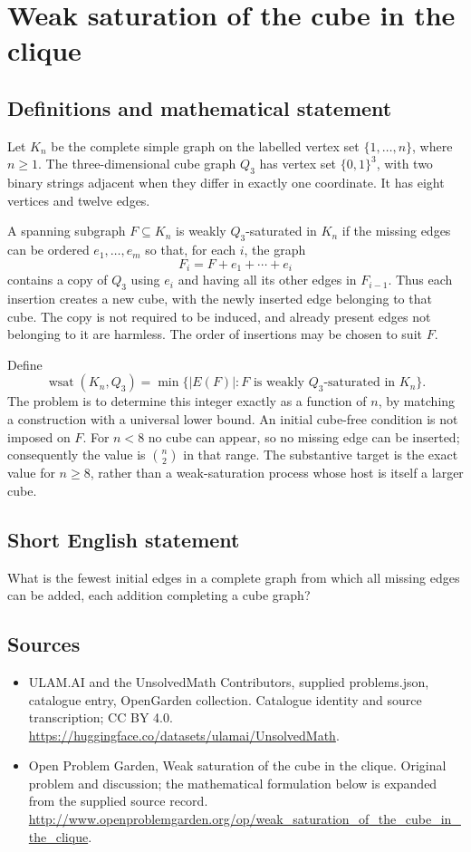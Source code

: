 \documentclass[11pt,a4paper]{article}
\begin{document}
\section*{Weak saturation of the cube in the clique}\label{statement}

\subsection{Definitions and mathematical statement}
Let $K_n$ be the complete simple graph on the labelled vertex set
$\{1,\ldots,n\}$, where $n\ge1$. The three-dimensional cube graph $Q_3$
has vertex set $\{0,1\}^3$, with two binary strings adjacent when they
differ in exactly one coordinate. It has eight vertices and twelve
edges.

A spanning subgraph $F\subseteq K_n$ is weakly $Q_3$-saturated in $K_n$
if the missing edges can be ordered $e_1,\ldots,e_m$ so that, for each
$i$, the graph
\[
                   F_i=F+e_1+\cdots+e_i
\]
contains a copy of $Q_3$ using $e_i$ and having all its other edges in
$F_{i-1}$. Thus each insertion creates a new cube, with the newly
inserted edge belonging to that cube. The copy is not required to be
induced, and already present edges not belonging to it are harmless.
The order of insertions may be chosen to suit $F$.

Define
\[
 \operatorname{wsat}(K_n,Q_3)=
       \min\{|E(F)|:F\text{ is weakly }Q_3\text{-saturated in }K_n\}.
\]
The problem is to determine this integer exactly as a function of $n$,
by matching a construction with a universal lower bound. An initial
cube-free condition is not imposed on $F$. For $n<8$ no cube can appear,
so no missing edge can be inserted; consequently the value is
$\binom n2$ in that range. The substantive target is the exact value
for $n\ge8$, rather than a weak-saturation process whose host is itself
a larger cube.
\subsection{Short English statement}
What is the fewest initial edges in a complete graph from which all missing edges can be added, each addition completing a cube graph?
\subsection{Sources}
\begin{itemize}
\item[S1] ULAM.AI and the UnsolvedMath Contributors, supplied problems.json, catalogue entry, OpenGarden collection. Catalogue identity and source transcription; CC BY 4.0.
\url{https://huggingface.co/datasets/ulamai/UnsolvedMath}.
\item[S2] Open Problem Garden, Weak saturation of the cube in the clique. Original problem and discussion; the mathematical formulation below is expanded from the supplied source record.
\url{http://www.openproblemgarden.org/op/weak_saturation_of_the_cube_in_the_clique}.
\end{itemize}
\end{document}
